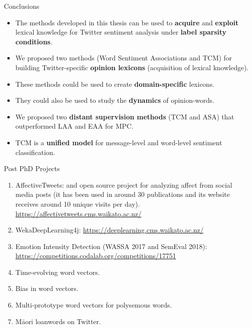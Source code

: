 \documentclass[handout]{beamer}
\begin{document}
\begin{frame}{Conclusions}
\begin{scriptsize}
\begin{itemize}
\item The methods developed in this thesis can be used to \textbf{acquire} and \textbf{exploit} lexical knowledge for Twitter sentiment analysis under \textbf{label sparsity conditions}. 

\item We proposed two methods (Word Sentiment Associations and TCM) for building Twitter-specific \textbf{opinion lexicons} (acquisition of lexical knowledge).

\item These methods could be used to create \textbf{domain-specific} lexicons.
\item They could also be used to study the \textbf{dynamics} of opinion-words.

\item  We proposed two \textbf{distant supervision methods} (TCM and ASA) that outperformed LAA and EAA for MPC.

\item TCM is a \textbf{unified model} for message-level and word-level sentiment classification.


\end{itemize}
\end{scriptsize}

\end{frame}



\begin{frame}{Post PhD Projects}

\begin{enumerate}
 \item AffectiveTweets: and open source project for analyzing affect from social media posts (it has been used in around 30 publications and its website receives around 10 unique visits per day). \url{https://affectivetweets.cms.waikato.ac.nz/}
 \item WekaDeepLearning4j: \url{https://deeplearning.cms.waikato.ac.nz/}
 \item Emotion Intensity Detection (WASSA 2017 and SemEval 2018): \url{https://competitions.codalab.org/competitions/17751}
 \item Time-evolving word vectors.
 \item Bias in word vectors.
 \item Multi-prototype word vectors for polysemous words.
 \item M\={a}ori loanwords on Twitter.
 \end{enumerate}

\end{frame}
\end{document}

